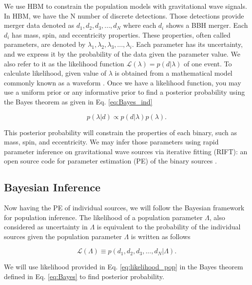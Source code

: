 \documentclass[twocolumn,prd,nofootinbib]{revtex4}
\begin{document}
We use HBM to constrain the population models with gravitational wave signals. In HBM, we have the N number of discrete detections. Those detections provide merger data denoted as $d_1,d_2,d_3,...,d_N$ where each $d_i$ shows a BBH merger. Each $d_i$ has mass, spin, and eccentricity properties. These properties, often called parameters, are denoted by $\lambda_1,\lambda_2,\lambda_3,...,\lambda_i$. Each parameter has its uncertainty, and we express it by the probability of the data given the parameter value. We also refer to it as the likelihood function $\mathcal{L}(\lambda)=p(d|\lambda)$ of one event. To calculate likelihood, given value of $\lambda$ is obtained from a mathematical model commonly known as a waveform . Once we have a likelihood function, you may use a uniform prior or any informative prior to find a posterior probability using the Bayes theorem as given in Eq. \ref{eq:Bayes_ind}

\begin{equation}
\label{eq:Bayes_ind}    
p(\lambda|d) \propto p(d|\lambda) p(\lambda).
\end{equation}

This posterior probability will constrain the properties of each binary, such as mass, spin, and eccentricity. We may infer those parameters using rapid parameter inference on gravitational wave sources via iterative fitting (RIFT): an open source code for parameter estimation (PE) of the binary sources \cite{rift_2018}.



\subsection{Bayesian Inference}

Now having the PE of individual sources, we will follow the Bayesian framework for population inference. The likelihood of a population parameter $\Lambda$, also considered as uncertainty in $\Lambda$ is equivalent to the probability of the individual sources given the population parameter $\Lambda$ is written as follows

\begin{equation}
\label{eq:likelihood_pop}    
\mathcal{L}(\Lambda)\equiv p(d_1,d_2,d_3,...,d_N|\Lambda).
\end{equation}

 

We will use likelihood provided in Eq. \ref{eq:likelihood_pop} in the Bayes theorem defined in Eq. \ref{eq:Bayes} to find posterior probability.
\end{document}

